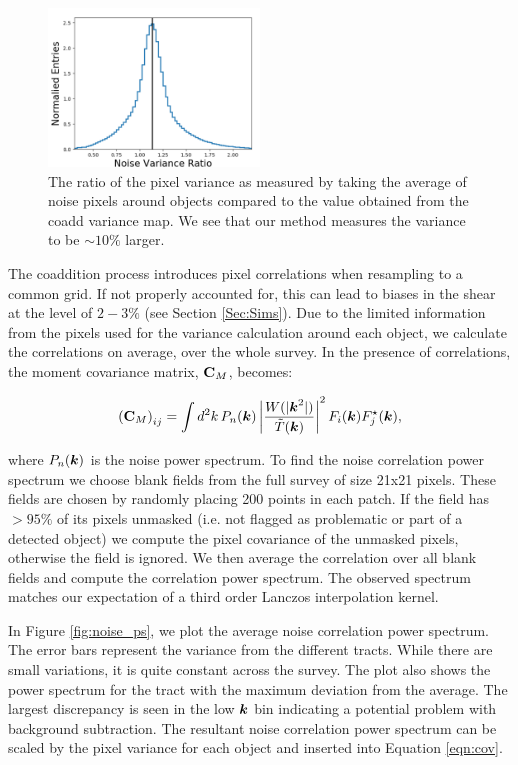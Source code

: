 \documentclass[useAMS,usenatbib]{mnras}
\newcommand{\veck}{\mbox{\boldmath $k$}}
\newcommand{\matC}{\mbox{$\bf C$}}
\begin{document}
\begin{figure}
    \includegraphics[width=0.5\textwidth]{noise_compare.png}
    \caption{
       The ratio of the pixel variance as measured by taking the average of noise pixels around objects compared to the value obtained from the coadd variance map.  We see that our method measures the variance to be $\sim10\%$ larger. 
    }
    \label{fig:noise_compare}
\end{figure}



The coaddition process introduces pixel correlations when resampling to a common grid.  If not properly accounted for, this can lead to biases in the shear at the level of $2-3\%$ (see Section \ref{Sec:Sims}).  Due to the limited information from the pixels used for the variance calculation around each object, we calculate the correlations on average, over the whole survey.  In the presence of correlations, the moment covariance matrix, $\matC_M$, becomes:

\begin{equation}
\left(\matC_M\right)_{ij} = 
\int d^2k\, P_n(\veck) \left| \frac{W(|\veck^2|)}{\tilde T(\veck)}
\right|^2 F_i(\veck) F^\star_j(\veck),
\label{eqn:cov}
\end{equation}

where $P_n(\veck)$ is the noise power spectrum.  To find the noise correlation power spectrum we choose blank fields from the full survey of size 21x21 pixels.  These fields are chosen by randomly placing 200 points in each patch. If the field has $> 95\%$ of its pixels unmasked (i.e. not flagged as problematic or part of a detected object) we compute the pixel covariance of the unmasked pixels, otherwise the field is ignored.  We then average the correlation over all blank fields and compute the correlation power spectrum.  The observed spectrum matches our expectation of a third order Lanczos interpolation kernel.  

In Figure \ref{fig:noise_ps}, we plot the average noise correlation power spectrum.  The error bars represent the variance from the different tracts.  While there are small variations, it is quite constant across the survey.  The plot also shows the power spectrum for the tract with the maximum deviation from the average.  The largest discrepancy is seen in the low $\veck$ bin indicating a potential problem with background subtraction.  The resultant noise correlation power spectrum can be scaled by the pixel variance for each object and inserted into Equation \ref{eqn:cov}. 
\end{document}
